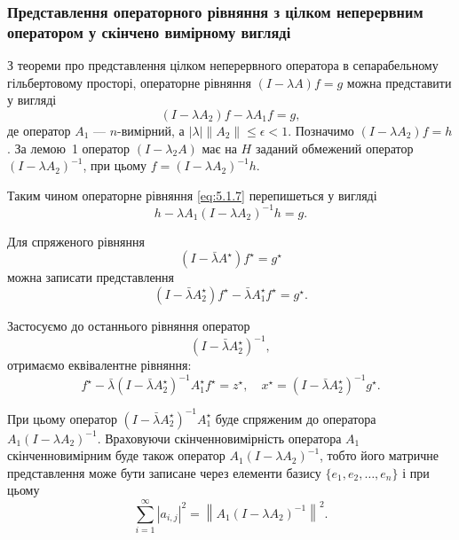 \subsubsection{Представлення операторного рівняння з цілком не\-пе\-рер\-в\-ним оператором у скінчено вимірному вигляді}

З теореми про представлення цілком неперервного оператора в сепарабельному гільбертовому просторі, операторне рівняння $(I - \lambda A) f = g$ можна представити у вигляді
\begin{equation}
    \label{eq:5.1.7}
    (I - \lambda A_2) f - \lambda A_1 f = g,
\end{equation}
де оператор $A_1$ --- $n$-вимірний, а $|\lambda| \|A_2\| \le \epsilon < 1$. Позначимо $(I - \lambda A_2) f = h$. За лемою~1 оператор $(I - \lambda_2 A)$ має на $H$ заданий обмежений оператор $(I - \lambda A_2)^{-1}$, при цьому $f = (I - \lambda A_2)^{-1} h$. \medskip

Таким чином операторне рівняння \eqref{eq:5.1.7} перепишеться у вигляді
\begin{equation}
    \label{eq:5.1.8}
    h - \lambda A_1 (I - \lambda A_2)^{-1} h = g.
\end{equation}

Для спряженого рівняння
\begin{equation}
    \label{eq:5.1.5'}
    (I - \bar \lambda A^\star) f^\star = g^\star
\end{equation}
можна записати представлення
\begin{equation}
    \label{eq:5.1.7'}
    (I - \bar \lambda A_2^\star) f^\star - \bar \lambda A_1^\star f^\star = g^\star.
\end{equation}

Застосуємо до останнього рівняння оператор
\begin{equation*}
    \left( I - \bar \lambda A_2^\star \right)^{-1},
\end{equation*}
отримаємо еквівалентне рівняння:
\begin{equation}
    \label{eq:5.1.8'}
    f^\star - \bar \lambda \left( I - \bar \lambda A_2^\star \right)^{-1} A_1^\star f^\star = z^\star, \quad x^\star = \left( I - \bar \lambda A_2^\star \right)^{-1} g^\star.
\end{equation}

При цьому оператор $\left( I - \bar \lambda A_2^\star \right)^{-1} A_1^\star$ буде спряженим до оператора $A_1 (I - \lambda A_2)^{-1}$. Враховуючи скінченновимірність оператора $A_1$ скінченновимірним буде також оператор $A_1 (I - \lambda A_2)^{-1}$, тобто його матричне представлення може бути записане через елементи базису $\{e_1, e_2, \ldots, e_n\}$ і при цьому
\begin{equation*}
    \sum_{i = 1}^\infty |a_{i,j}|^2 = \left\| A_1 (I - \lambda A_2)^{-1} \right\|^2.
\end{equation*}

